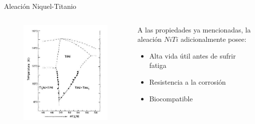 \documentclass[11pt]{beamer}
\begin{document}
		\begin{frame}{Aleación Niquel-Titanio}
			\begin{columns}[T]
				\begin{column}{.49\textwidth}
					\begin{figure}[H]
					\centering
					\includegraphics[scale=0.35]{img/DiagramaNiTi.jpg}
					\end{figure}
				\end{column}
				\begin{column}{.49\textwidth}
				A las propiedades ya mencionadas, la aleación $NiTi$ adicionalmente posee:
					\begin{itemize}
						\item Alta vida útil antes de sufrir fatiga
						\item Resistencia a la corrosión
						\item Biocompatible
					\end{itemize}
				\end{column}
			\end{columns}
		\end{frame}
		
\end{document}
